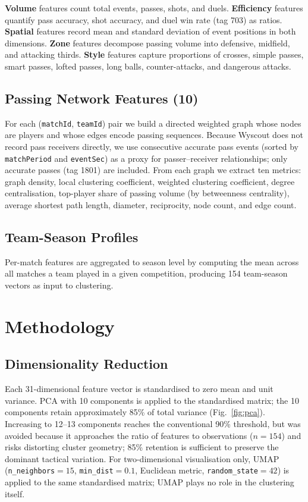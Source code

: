 \documentclass[runningheads]{llncs}
\begin{document}
\textbf{Volume} features count total events, passes, shots, and duels. \textbf{Efficiency} features quantify pass accuracy, shot accuracy, and duel win rate (tag 703) as ratios. \textbf{Spatial} features record mean and standard deviation of event positions in both dimensions. \textbf{Zone} features decompose passing volume into defensive, midfield, and attacking thirds. \textbf{Style} features capture proportions of crosses, simple passes, smart passes, lofted passes, long balls, counter-attacks, and dangerous attacks.

\subsection{Passing Network Features (10)}

For each (\texttt{matchId}, \texttt{teamId}) pair we build a directed weighted graph whose nodes are players and whose edges encode passing sequences. Because Wyscout does not record pass receivers directly, we use consecutive accurate pass events (sorted by \texttt{matchPeriod} and \texttt{eventSec}) as a proxy for passer--receiver relationships; only accurate passes (tag 1801) are included. From each graph we extract ten metrics: graph density, local clustering coefficient, weighted clustering coefficient, degree centralisation, top-player share of passing volume (by betweenness centrality), average shortest path length, diameter, reciprocity, node count, and edge count.

\subsection{Team-Season Profiles}

Per-match features are aggregated to season level by computing the mean across all matches a team played in a given competition, producing 154 team-season vectors as input to clustering.

\section{Methodology}

\subsection{Dimensionality Reduction}

Each 31-dimensional feature vector is standardised to zero mean and unit variance. PCA with 10 components is applied to the standardised matrix; the 10 components retain approximately 85\% of total variance (Fig.~\ref{fig:pca}). Increasing to 12--13 components reaches the conventional 90\% threshold, but was avoided because it approaches the ratio of features to observations ($n = 154$) and risks distorting cluster geometry; 85\% retention is sufficient to preserve the dominant tactical variation. For two-dimensional visualisation only, UMAP (\texttt{n\_neighbors}$= 15$, \texttt{min\_dist}$= 0.1$, Euclidean metric, \texttt{random\_state}$= 42$) is applied to the same standardised matrix; UMAP plays no role in the clustering itself.
\end{document}
